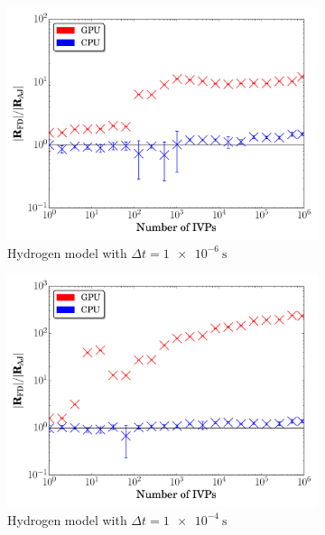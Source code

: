 \documentclass[preprint,review,11pt]{elsarticle}
\begin{document}
\begin{figure}[htbp]
  \centering
  \begin{subfigure}{0.49\textwidth}
      \includegraphics[width=\linewidth]{H2_1e-06_ajac_comp.pdf}
      \caption{Hydrogen model with $\Delta t = \SI{1e-6}{\second}$}
      \label{F:AJ_h2_small}
  \end{subfigure}
  \begin{subfigure}{0.49\textwidth}
      \includegraphics[width=\linewidth]{H2_1e-04_ajac_comp.pdf}
      \caption{Hydrogen model with $\Delta t = \SI{1e-4}{\second}$}
      \label{F:AJ_h2_large}
  \end{subfigure}
  \\
  \begin{subfigure}{0.49\textwidth}

\end{subfigure}
\end{figure}
\end{document}
